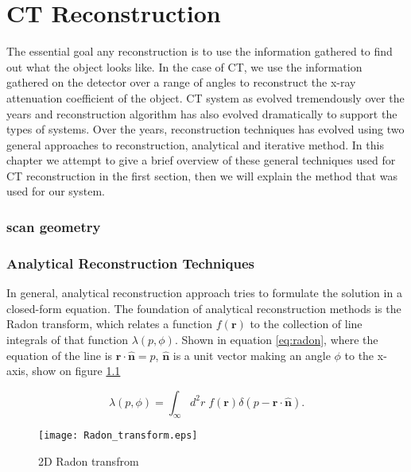 \chapter{CT Reconstruction}
\label{chap:reconstruction}

The essential goal any reconstruction is to use the information gathered to find out what the object looks like.  In the case of CT, we use the information gathered on the detector over a range of angles to reconstruct the x-ray attenuation coefficient of the object.  CT system as evolved tremendously over the years and reconstruction algorithm has also evolved dramatically to support the types of systems. Over the years, reconstruction techniques has evolved using two general approaches to reconstruction, analytical and iterative method.  In this chapter we attempt to give a brief overview of these general techniques used for CT reconstruction in the first section, then we will explain the method that was used for our system.

\subsection{scan geometry}


\subsection{Analytical Reconstruction Techniques}
In general, analytical reconstruction approach tries to formulate the solution in a closed-form equation.  The foundation of analytical reconstruction methods is the Radon transform, which relates a function $f(\mathbf{r})$ to the collection of line integrals of that function $\lambda(p, \phi)$.  Shown in equation \ref{eq:radon}, where the equation of the line is $\mathbf{r \cdot \hat{n}} = p$, $\mathbf{\hat{n}}$ is a unit vector making an angle $\phi$ to the x-axis, show on figure \ref{fig:RadonTransform}

\begin{equation}
\lambda(p, \phi) = \int_\infty d^2r \; f(\mathbf{r}) \delta(p- \mathbf{r} \cdot \mathbf{\hat{n}}).
\label{eq:radon}
\end{equation}

\begin{figure}
\centering
\texttt{[image: Radon\_transform.eps]}
\caption{2D Radon transfrom }
\label{fig:RadonTransform}
\end{figure}

